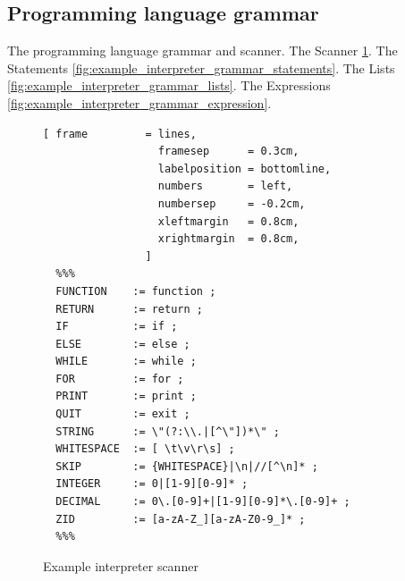 \subsection{Programming language grammar}
The programming language grammar and scanner.
The Scanner \ref{fig:example_interpreter_grammar_scanner}.
The Statements \ref{fig:example_interpreter_grammar_statements}.
The Lists \ref{fig:example_interpreter_grammar_lists}.
The Expressions \ref{fig:example_interpreter_grammar_expression}.
%
\begin{figure}[!ht]

\begin{Verbatim}[ frame         = lines, 
                  framesep      = 0.3cm, 
                  labelposition = bottomline,
                  numbers       = left,
                  numbersep     = -0.2cm,
                  xleftmargin   = 0.8cm,
                  xrightmargin  = 0.8cm,
                ]
  %%%
  FUNCTION    := function ;
  RETURN      := return ;
  IF          := if ;
  ELSE        := else ;
  WHILE       := while ;
  FOR         := for ;
  PRINT       := print ;
  QUIT        := exit ;
  STRING      := \"(?:\\.|[^\"])*\" ;
  WHITESPACE  := [ \t\v\r\s] ;
  SKIP        := {WHITESPACE}|\n|//[^\n]* ;
  INTEGER     := 0|[1-9][0-9]* ;
  DECIMAL     := 0\.[0-9]+|[1-9][0-9]*\.[0-9]+ ;
  ZID         := [a-zA-Z_][a-zA-Z0-9_]* ;  
  %%%
\end{Verbatim}
\caption{Example interpreter scanner}
\label{fig:example_interpreter_grammar_scanner}
\end{figure}
